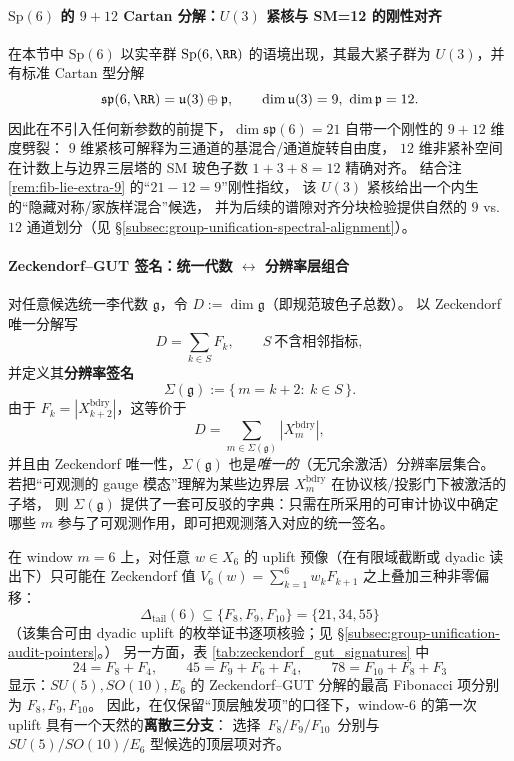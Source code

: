 \paragraph{\texorpdfstring{$\mathrm{Sp}(6)$}{Sp(6)} 的 $9+12$ Cartan 分解：\texorpdfstring{$U(3)$}{U(3)} 紧核与 SM=12 的刚性对齐}
在本节中 \(\mathrm{Sp}(6)\) 以实辛群 \(\mathrm{Sp}(6,\RR)\) 的语境出现，其最大紧子群为 \(U(3)\)，并有标准 Cartan 型分解
\[
\mathfrak{sp}(6,\RR)=\mathfrak{u}(3)\oplus \mathfrak{p},\qquad \dim\mathfrak{u}(3)=9,\ \dim\mathfrak{p}=12.
\]
因此在不引入任何新参数的前提下，\(\dim\mathfrak{sp}(6)=21\) 自带一个刚性的 \(9+12\) 维度劈裂：
\(9\) 维紧核可解释为三通道的基混合/通道旋转自由度，
\(12\) 维非紧补空间在计数上与边界三层塔的 SM 玻色子数 \(1+3+8=12\) 精确对齐。
结合注 \ref{rem:fib-lie-extra-9} 的“\(21-12=9\)”刚性指纹，
该 \(U(3)\) 紧核给出一个内生的“隐藏对称/家族样混合”候选，
并为后续的谱隙对齐分块检验提供自然的 \(9\) vs.\ \(12\) 通道划分（见 \S\ref{subsec:group-unification-spectral-alignment}）。

\paragraph{Zeckendorf--GUT 签名：统一代数 \texorpdfstring{$\leftrightarrow$}{<->} 分辨率层组合}
对任意候选统一李代数 \(\mathfrak g\)，令 \(D:=\dim\mathfrak g\)（即规范玻色子总数）。
以 Zeckendorf 唯一分解写
\[
D=\sum_{k\in S}F_k,\qquad S\ \text{不含相邻指标},
\]
并定义其\textbf{分辨率签名}
\[
\Sigma(\mathfrak g):=\{\,m=k+2:\ k\in S\,\}.
\]
由于 \(F_k=|X^{\mathrm{bdry}}_{k+2}|\)，这等价于
\[
D=\sum_{m\in\Sigma(\mathfrak g)}|X_m^{\mathrm{bdry}}|,
\]
并且由 Zeckendorf 唯一性，\(\Sigma(\mathfrak g)\) 也是\emph{唯一的}（无冗余激活）分辨率层集合。
若把“可观测的 gauge 模态”理解为某些边界层 \(X_m^{\mathrm{bdry}}\) 在协议核/投影门下被激活的子塔，
则 \(\Sigma(\mathfrak g)\) 提供了一套可反驳的字典：只需在所采用的可审计协议中确定哪些 \(m\) 参与了可观测作用，即可把观测落入对应的统一签名。



\begin{corollary}\label{cor:fold6-tail-offsets-gut-top-terms}
在 window \(m=6\) 上，对任意 \(w\in X_6\) 的 uplift 预像（在有限域截断或 dyadic 读出下）只可能在 Zeckendorf 值
\(
V_6(w)=\sum_{k=1}^{6}w_kF_{k+1}
\)
之上叠加三种非零偏移：
\[
\Delta_{\mathrm{tail}}(6)\subseteq \{F_8,F_9,F_{10}\}=\{21,34,55\}
\]
（该集合可由 dyadic uplift 的枚举证书逐项核验；见 \S\ref{subsec:group-unification-audit-pointers}。）
另一方面，表 \ref{tab:zeckendorf_gut_signatures} 中
\[
24=F_8+F_4,\qquad 45=F_9+F_6+F_4,\qquad 78=F_{10}+F_8+F_3
\]
显示：\(SU(5),SO(10),E_6\) 的 Zeckendorf--GUT 分解的最高 Fibonacci 项分别为 \(F_8,F_9,F_{10}\)。
因此，在仅保留“顶层触发项”的口径下，window-\(6\) 的第一次 uplift 具有一个天然的\textbf{离散三分支}：
选择 \(\,F_8/F_9/F_{10}\,\) 分别与 \(SU(5)/SO(10)/E_6\) 型候选的顶层项对齐。
\end{corollary}

